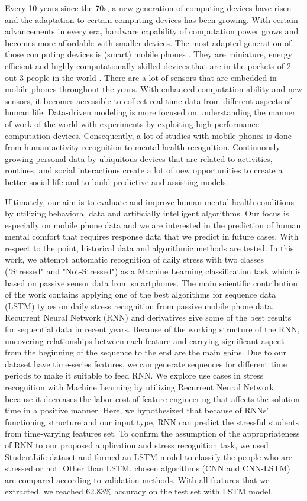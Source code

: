 \documentclass[3p,times,procedia]{elsarticle}
\begin{document}
Every 10 years since the 70s, a new generation of computing devices have risen and the adaptation to certain computing devices has been growing. With certain advancements in every era, hardware capability of computation power grows and becomes more affordable with smaller devices. The most adapted generation of those computing devices is (smart) mobile phones \cite{ict}. They are miniature, energy efficient and highly computationally skilled devices that are in the pockets of 2 out 3 people in the world \cite{DaSilva2019}. There are a lot of sensors that are embedded in mobile phones throughout the years. With enhanced computation ability and new sensors, it becomes accessible to collect real-time data from different aspects of human life. Data-driven modeling is more focused on understanding the manner of work of the world with experiments by exploiting high-performance computation devices. Consequently, a lot of studies with mobile phones is done from human activity recognition to mental health recognition. Continuously growing personal data by ubiquitous devices that are related to activities, routines, and social interactions create a lot of new opportunities to create a better social life and to build predictive and assisting models.
  
Ultimately, our aim is to evaluate and improve human mental health conditions by utilizing behavioral data and artificially intelligent algorithms. Our focus is especially on mobile phone data and we are interested in the prediction of human mental comfort that requires response data that we predict in future cases. With respect to the point, historical data and algorithmic methods are tested. In this work, we attempt automatic recognition of daily stress with two classes ("Stressed" and "Not-Stressed") as a Machine Learning classification task which is based on passive sensor data from smartphones. The main scientific contribution of the work contains applying one of the best algorithms for sequence data (LSTM) types on daily stress recognition from passive mobile phone data. Recurrent Neural Network (RNN) and derivatives give some of the best results for sequential data in recent years. Because of the working structure of the RNN, uncovering relationships between each feature and carrying significant aspect from the beginning of the sequence to the end are the main gains. Due to our dataset have time-series features, we can generate sequences for different time periods to make it suitable to feed RNN. We explore use cases in stress recognition with Machine Learning by utilizing Recurrent Neural Network because it decreases the labor cost of feature engineering that affects the solution time in a positive manner. Here, we hypothesized that because of RNNs’ functioning structure and our input type, RNN can predict the stressful students from time-varying features set. To confirm the assumption of the appropriateness of RNN to our proposed application and stress recognition task, we used StudentLife dataset and formed an LSTM model to classify the people who are stressed or not. Other than LSTM, chosen algorithms (CNN and CNN-LSTM) are compared according to validation methods. With all features that we extracted, we reached 62.83\% accuracy on the test set with LSTM model. 
  
\end{document}
